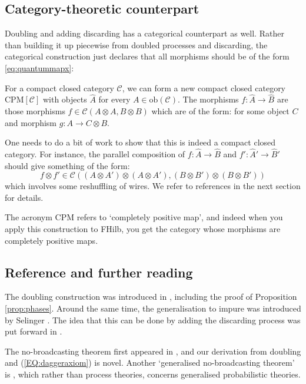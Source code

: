 \documentclass[10pt]{article}
\begin{document}
\subsection{Category-theoretic counterpart}

Doubling and adding discarding has a categorical counterpart as well. Rather than building it up piecewise from doubled processes and discarding, the categorical construction just declares that all morphisms should be of the form \eqref{eq:quantummapx}:

\begin{definition}
  For a compact closed category $\mathcal C$, we can form a new compact closed category $\textrm{CPM}[\mathcal C]$ with objects $\widehat A$ for every $A \in \textrm{ob}(\mathcal C)$. The morphisms $f : \widehat A \to \widehat B$ are those morphisms $f \in \mathcal C(A \otimes A, B \otimes B)$ which are of the form:
  for some object $C$ and morphism $g : A \to C \otimes B$.
\end{definition}

One needs to do a bit of work to show that this is indeed a compact closed category. For instance, the parallel composition of $f : \widehat A \to \widehat B$ and $f' : \widehat A' \to \widehat B'$ should give something of the form:
\[ 
f \otimes f' \in \mathcal C((A \otimes A') \otimes (A \otimes A'), (B \otimes B') \otimes (B \otimes B'))
\]
which involves some reshuffling of wires. We refer to references in the next section for details.

The acronym CPM refers to `completely positive map', and indeed when you apply this construction to FHilb, you get the category whose morphisms are completely positive maps.

\subsection{Reference and further reading}  
  
The doubling construction was introduced in \cite{DeLL}, including the  proof of Proposition \ref{prop:phases}. Around the same time, the  generalisation to impure was introduced by Selinger \cite{SelingerCPM}. The idea that this can be done by adding the discarding process was put forward in \cite{SelingerAxiom}. 

The no-broadcasting theorem first appeared in \cite{Nobroadcast}, and our derivation from doubling and (\ref{EQ:daggeraxiom})   is novel. Another `generalised no-broadcasting theorem' is \cite{BBLW}, which rather than  process theories, concerns  generalised probabilistic theories.
\end{document}
